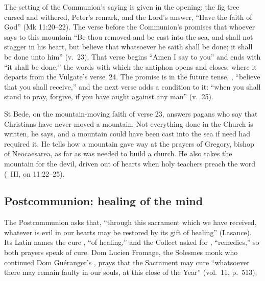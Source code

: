 The setting of the Communion's saying is given in the opening: the fig tree
cursed and withered, Peter's remark, and the Lord's answer, ``Have the faith of
God'' (Mk 11:20--22). The verse before the Communion's promises that whoever
says to this mountain ``Be thou removed and be cast into the sea, and shall not
stagger in his heart, but believe that whatsoever he saith shall be done; it
shall be done unto him'' (v.~23). That verse begins ``Amen I say to you'' and
ends with ``it shall be done,'' the words with which the antiphon opens and
closes, where it departs from the Vulgate's verse~24. The promise is in the future tense, , ``believe that you shall receive,'' and the next verse adds a
condition to it: ``when you shall stand to pray, forgive, if you have aught
against any man'' (v.~25).

St Bede, on the mountain-moving faith of verse 23, answers pagans who say
that Christians have never moved a mountain. Not everything done in the
Church is written, he says, and a mountain could have been cast into the sea
if need had required it. He tells how a mountain gave way at the prayers of
Gregory, bishop of Neocaesarea, as far as was needed to build a church. He
also takes the mountain for the devil, driven out of hearts when holy teachers
preach the word (~III, on
11:22--25).

\subsection{Postcommunion: healing of the mind}
\label{sec:element-postcommunion}

The Postcommunion asks that, ``through this sacrament which we have received,
whatever is evil in our hearts may be restored by its gift of healing''
(Lasance). Its Latin names the cure , ``of healing,'' and
the Collect asked for , ``remedies,'' so both prayers speak of
cure. Dom Lucien Fromage, the Solesmes monk who continued Dom
Guéranger's , prays that the Sacrament may cure
``whatsoever there may remain faulty in our souls, at this close of the Year''
(vol.~11, p.~513).
